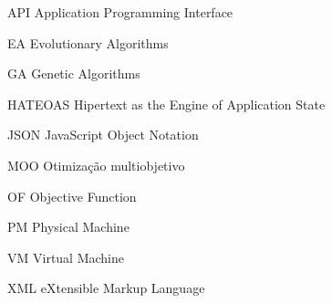 \begin{siglas}
    \item[API] Application Programming Interface
    \item[EA] Evolutionary Algorithms
    \item[GA] Genetic Algorithms
    \item[HATEOAS] Hipertext as the Engine of Application State
    \item[JSON] JavaScript Object Notation
    \item[MOO] Otimização multiobjetivo
    \item[OF] Objective Function
    \item[PM] Physical Machine
    \item[VM] Virtual Machine
    \item[XML] eXtensible Markup Language
\end{siglas}
